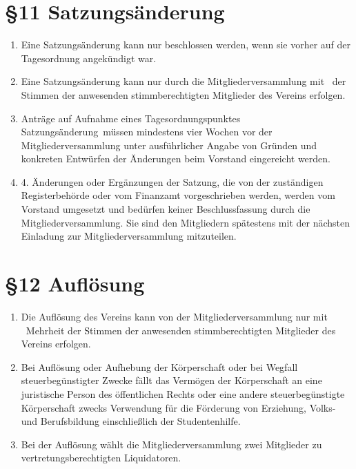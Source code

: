 \documentclass[11pt,ngerman]{article}
\begin{document}
\section*{§11 Satzungsänderung}
\begin{enumerate}
	\item Eine Satzungsänderung kann nur beschlossen werden, wenn sie vorher auf der Tagesordnung angekündigt war.
	\item Eine Satzungsänderung kann nur durch die Mitgliederversammlung mit \ der Stimmen der anwesenden stimmberechtigten Mitglieder des Vereins erfolgen.
	\item Anträge auf Aufnahme eines Tagesordnungspunktes \glqq Satzungsänderung\grqq\ müssen mindestens vier Wochen vor der Mitgliederversammlung unter ausführlicher Angabe von Gründen und konkreten Entwürfen der Änderungen beim Vorstand eingereicht werden.
	\item 4. Änderungen oder Ergänzungen der Satzung, die von der zuständigen Registerbehörde oder vom Finanzamt vorgeschrieben werden, werden vom Vorstand umgesetzt und bedürfen keiner Beschlussfassung durch die Mitgliederversammlung. Sie sind den Mitgliedern spätestens mit der nächsten Einladung zur Mitgliederversammlung mitzuteilen.
\end{enumerate}




\section*{§12 Auflösung}
\begin{enumerate}
 \item Die Auflösung des Vereins kann von der Mitgliederversammlung nur mit \ Mehrheit der Stimmen der anwesenden stimmberechtigten Mitglieder des Vereins erfolgen.
 \item Bei Auflösung oder Aufhebung der Körperschaft oder bei Wegfall steuerbegünstigter Zwecke fällt das Vermögen der Körperschaft an eine juristische Person des öffentlichen Rechts oder eine andere steuerbegünstigte Körperschaft zwecks Verwendung für die Förderung von Erziehung, Volks- und Berufsbildung einschließlich der Studentenhilfe.
 \item Bei der Auflösung wählt die Mitgliederversammlung zwei Mitglieder zu vertretungsberechtigten Liquidatoren.
\end{enumerate}

\newpage
\end{document}
